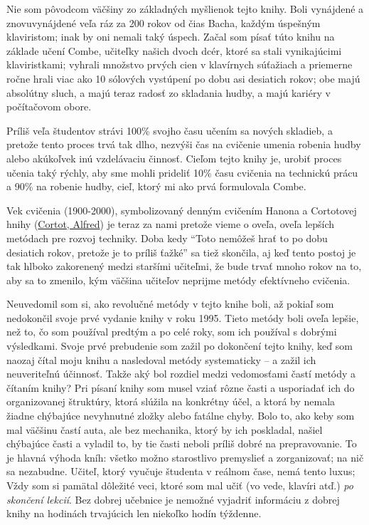 \documentclass[11pt,a4paper]{book}
\begin{document}
Nie som pôvodcom väčšiny zo základných myšlienok tejto knihy. Boli vynájdené a znovuvynájdené veľa ráz za 200 rokov od čias Bacha, každým úspešným klaviristom; inak by oni nemali taký úspech. Začal som písať túto knihu na základe učení Combe, učiteľky našich dvoch dcér, ktoré sa stali vynikajúcimi klaviristkami; vyhrali množstvo prvých cien v klavírnych súťažiach a priemerne ročne hrali viac ako 10 sólových vystúpení po dobu asi desiatich rokov; obe majú absolútny sluch, a majú teraz radosť zo skladania hudby, a majú kariéry v počítačovom obore. 

Príliš veľa študentov strávi 100\% svojho času učením sa nových skladieb, a pretože tento proces trvá tak dlho, nezvýši čas na cvičenie umenia robenia hudby alebo akúkoľvek inú vzdelávaciu činnosť. Cieľom tejto knihy je, urobiť proces učenia taký rýchly, aby sme mohli prideliť 10\% času cvičenia na technickú prácu a 90\% na robenie hudby, cieľ, ktorý mi ako prvá formulovala Combe.

Vek cvičenia (1900-2000), symbolizovaný denným cvičením Hanona a Cortotovej hnihy (\hyperlink{r:cortot}{Cortot, Alfred}) je teraz za nami pretože vieme o oveľa, oveľa lepších metódach pre rozvoj techniky. Doba kedy “Toto nemôžeš hrať to po dobu desiatich rokov, pretože je to príliš ťažké” sa tiež skončila, aj keď tento postoj je tak hlboko zakorenený medzi staršími učiteľmi, že bude trvať mnoho rokov na to, aby sa to zmenilo, kým väčšina učiteľov neprijme metódy efektívneho cvičenia.

Neuvedomil som si, ako revolučné metódy v tejto knihe boli, až pokiaľ som nedokončil svoje prvé  vydanie knihy v roku 1995. Tieto metódy boli oveľa lepšie, než to, čo som používal predtým a po celé roky, som ich používal s dobrými výsledkami. Svoje prvé prebudenie som zažil po dokončení tejto knihy, keď som naozaj čítal moju knihu a nasledoval metódy systematicky – a zažil ich neuveriteľnú účinnosť. Takže aký bol rozdiel medzi vedomosťami častí metódy a čítaním knihy? Pri písaní knihy som musel vziať rôzne časti a usporiadať ich do organizovanej štruktúry, ktorá slúžila na konkrétny účel, a ktorá by nemala žiadne chýbajúce nevyhnutné zložky alebo fatálne chyby. Bolo to, ako keby som mal väčšinu častí auta, ale bez mechanika, ktorý by ich poskladal, našiel chýbajúce časti a vyladil to, by tie časti neboli príliš dobré na prepravovanie. To je hlavná výhoda kníh: všetko možno starostlivo premyslieť a zorganizovať; na nič sa nezabudne. Učiteľ, ktorý vyučuje študenta v reálnom čase, nemá tento luxus; Vždy som si pamätal dôležité veci, ktoré som mal učiť (vo vede, klavíri atď.) \textit{po skončení lekcií}. Bez dobrej učebnice je nemožné vyjadriť informáciu z dobrej knihy na hodinách trvajúcich len niekoľko hodín týždenne.
\end{document}
